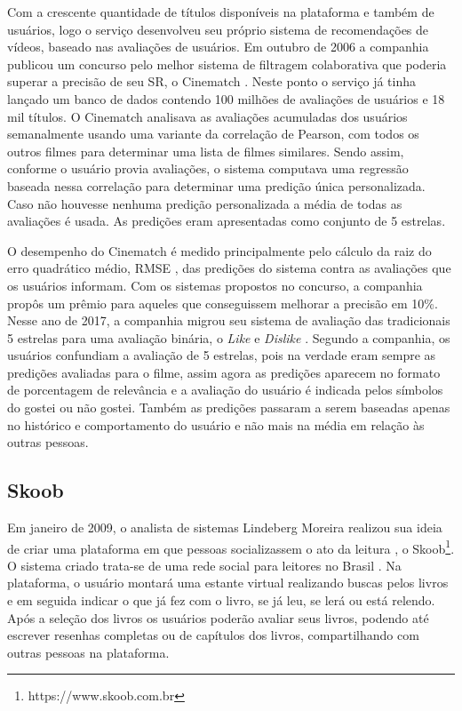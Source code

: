 Com a crescente quantidade de títulos disponíveis na plataforma e também de usuários, logo o serviço desenvolveu seu próprio sistema de recomendações de vídeos, baseado nas avaliações de usuários. Em outubro de 2006 a companhia publicou um concurso pelo melhor sistema de filtragem colaborativa que poderia superar a precisão de seu SR, o Cinematch \citep{bennett2007netflix}. Neste ponto o serviço já tinha lançado um banco de dados contendo 100 milhões de avaliações de usuários e 18 mil títulos. O Cinematch analisava as avaliações acumuladas dos usuários semanalmente usando uma variante da correlação de Pearson, com todos os outros filmes para determinar uma lista de filmes similares. Sendo assim, conforme o usuário provia avaliações, o sistema computava uma regressão baseada nessa correlação para determinar uma predição única personalizada. Caso não houvesse nenhuma predição personalizada a média de todas as avaliações é usada. As predições eram apresentadas como conjunto de 5 estrelas.

O desempenho do Cinematch é medido principalmente pelo cálculo da raiz do erro quadrático médio, \ac{RMSE} \citep{Herlocker:2004:ECF:963770.963772}, das predições do sistema contra as avaliações que os usuários informam. Com os sistemas propostos no concurso, a companhia propôs um prêmio para aqueles que conseguissem melhorar a precisão em 10\%. Nesse ano de 2017, a companhia migrou seu sistema de avaliação das tradicionais 5 estrelas para uma avaliação binária, o \textit{Like} e \textit{Dislike} \citep{ VarietyNetflix:2017}. Segundo a companhia, os usuários confundiam a avaliação de 5 estrelas, pois na verdade eram sempre as predições avaliadas para o filme, assim agora as predições aparecem no formato de porcentagem de relevância e a avaliação do usuário é indicada pelos símbolos do gostei ou não gostei. Também as predições passaram a serem baseadas apenas no histórico e comportamento do usuário e não mais na média em relação às outras pessoas.

\subsection{Skoob}

Em janeiro de 2009, o analista de sistemas Lindeberg Moreira realizou sua ideia de criar uma plataforma em que pessoas socializassem o ato da leitura \citep{SkoobSocializando:2009}, o Skoob\footnote{ https://www.skoob.com.br}. O sistema criado trata-se de uma rede social para leitores no Brasil \citep{SkoobQuemSomos:2017}. Na plataforma, o usuário montará uma estante virtual realizando buscas pelos livros e em seguida indicar o que já fez com o livro, se já leu, se lerá ou está relendo. Após a seleção dos livros os usuários poderão avaliar seus livros, podendo até escrever resenhas completas ou de capítulos dos livros, compartilhando com outras pessoas na plataforma.

